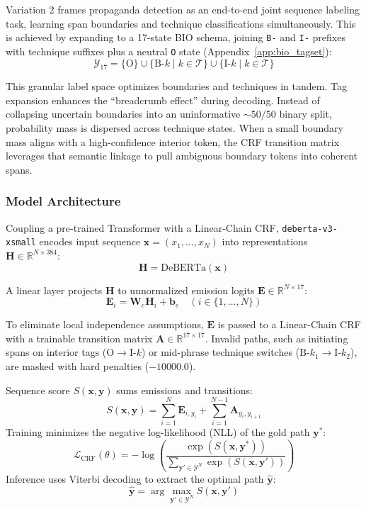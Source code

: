 \documentclass[12pt, a4paper]{article}
\begin{document}
Variation 2 frames propaganda detection as an end-to-end joint sequence labeling task, learning span boundaries and technique classifications simultaneously. This is achieved by expanding to a 17-state BIO schema, joining \texttt{B-} and \texttt{I-} prefixes with technique suffixes plus a neutral \texttt{O} state (Appendix~\ref{app:bio_tagset}):
\[
\mathcal{Y}_{17} = \{\text{O}\} \cup \{\text{B-}k \mid k \in \mathcal{T}\} \cup \{\text{I-}k \mid k \in \mathcal{T}\}
\]

This granular label space optimizes boundaries and techniques in tandem. Tag expansion enhances the ``breadcrumb effect'' during decoding. Instead of collapsing uncertain boundaries into an uninformative $\sim 50/50$ binary split, probability mass is dispersed across technique states. When a small boundary mass aligns with a high-confidence interior token, the CRF transition matrix leverages that semantic linkage to pull ambiguous boundary tokens into coherent spans.

\subsubsection{Model Architecture}
\label{subsubsec:task2_architecture}

Coupling a pre-trained Transformer with a Linear-Chain CRF, \texttt{deberta-v3-xsmall} encodes input sequence $\mathbf{x} = (x_1, \dots, x_N)$ into representations $\mathbf{H} \in \mathbb{R}^{N \times 384}$:
\[
\mathbf{H} = \text{DeBERTa}(\mathbf{x})
\]

A linear layer projects $\mathbf{H}$ to unnormalized emission logits $\mathbf{E} \in \mathbb{R}^{N \times 17}$:
\[
\mathbf{E}_i = \mathbf{W}_e \mathbf{H}_i + \mathbf{b}_e \quad (i \in \{1, \dots, N\})
\]

To eliminate local independence assumptions, $\mathbf{E}$ is passed to a Linear-Chain CRF with a trainable transition matrix $\mathbf{A} \in \mathbb{R}^{17 \times 17}$. Invalid paths, such as initiating spans on interior tags ($\text{O} \rightarrow \text{I-}k$) or mid-phrase technique switches ($\text{B-}k_1 \rightarrow \text{I-}k_2$), are masked with hard penalties ($-10000.0$).


Sequence score $S(\mathbf{x}, \mathbf{y})$ sums emissions and transitions:
\[
S(\mathbf{x}, \mathbf{y}) = \sum_{i=1}^{N} \mathbf{E}_{i, y_i} + \sum_{i=1}^{N-1} \mathbf{A}_{y_i, y_{i+1}}
\]
Training minimizes the negative log-likelihood (NLL) of the gold path $\mathbf{y}^*$:
\[
\mathcal{L}_{\text{CRF}}(\theta) = -\log \left( \frac{\exp(S(\mathbf{x}, \mathbf{y}^*))}{\sum_{\mathbf{y}' \in \mathcal{Y}^{N}} \exp(S(\mathbf{x}, \mathbf{y}'))} \right)
\]
Inference uses Viterbi decoding to extract the optimal path $\hat{\mathbf{y}}$:
\[
\hat{\mathbf{y}} = \arg\max_{\mathbf{y}' \in \mathcal{Y}^{N}} S(\mathbf{x}, \mathbf{y}')
\]
\end{document}
